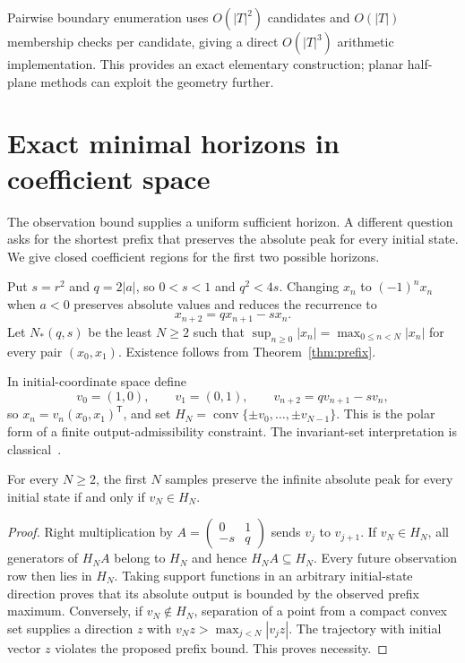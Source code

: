 \documentclass[11pt,a4paper]{article}
\begin{document}
Pairwise boundary enumeration uses $O(|T|^2)$ candidates and
$O(|T|)$ membership checks per candidate, giving a direct
$O(|T|^3)$ arithmetic implementation. This provides an exact elementary
construction; planar half-plane methods can exploit the geometry further.

\section{Exact minimal horizons in coefficient space}\label{sec:minimal}
The observation bound supplies a uniform sufficient horizon. A different
question asks for the shortest prefix that preserves the absolute peak
for every initial state. We give closed coefficient regions for the first
two possible horizons.

Put $s=r^2$ and $q=2|a|$, so $0<s<1$ and $q^2<4s$.
Changing $x_n$ to $(-1)^n x_n$ when $a<0$ preserves absolute values and
reduces the recurrence to
\begin{equation}\label{eq:qsrecurrence}
 x_{n+2}=q x_{n+1}-s x_n.
\end{equation}
Let $N_*(q,s)$ be the least $N\ge2$ such that
$\sup_{n\ge0}|x_n|=\max_{0\le n<N}|x_n|$ for every pair $(x_0,x_1)$.
Existence follows from Theorem~\ref{thm:prefix}.

In initial-coordinate space define
\[
 v_0=(1,0),\qquad v_1=(0,1),\qquad
 v_{n+2}=qv_{n+1}-sv_n,
\]
so $x_n=v_n(x_0,x_1)^\mathsf T$, and set
$H_N=\operatorname{conv}\{\pm v_0,\ldots,\pm v_{N-1}\}$.
This is the polar form of a finite output-admissibility constraint.
The invariant-set interpretation is classical~\cite{gilbert,ossareh}.

\begin{lemma}\label{lem:hullstop}
For every $N\ge2$, the first $N$ samples preserve the infinite absolute
peak for every initial state if and only if $v_N\in H_N$.
\end{lemma}
\begin{proof}
Right multiplication by
$A=\begin{pmatrix}0&1\\-s&q\end{pmatrix}$ sends $v_j$ to $v_{j+1}$.
If $v_N\in H_N$, all generators of $H_NA$ belong to $H_N$ and hence
$H_NA\subseteq H_N$. Every future observation row then lies in $H_N$.
Taking support functions in an arbitrary initial-state direction proves
that its absolute output is bounded by the observed prefix maximum.
Conversely, if $v_N\notin H_N$, separation of a point from a compact
convex set supplies a direction $z$ with
$v_Nz>\max_{j<N}|v_jz|$. The trajectory with initial vector $z$ violates
the proposed prefix bound. This proves necessity.
\end{proof}
\end{document}
